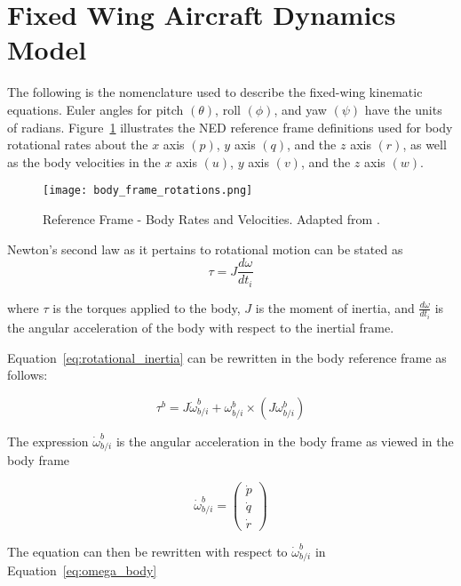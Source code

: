 \label{appendix:dynamics_model}
\section{Fixed Wing Aircraft Dynamics Model}

The following is the nomenclature used to describe the fixed-wing kinematic equations.  Euler angles for pitch $(\theta)$, roll $(\phi)$, and yaw $(\psi)$ have the units of radians.  Figure~\ref{fig:reference_frame} illustrates the \ac{NED} reference frame definitions used for body rotational rates about the $x$ axis $(p)$, $y$ axis $(q)$, and the $z$ axis $(r)$, as well as the body velocities in the $x$ axis $(u)$, $y$ axis $(v)$, and the $z$ axis $(w)$.

\begin{figure}[h!]
 \centering
  \texttt{[image: body\_frame\_rotations.png]}
  \caption{Reference Frame - Body Rates and Velocities.  Adapted from \cite{flitetest}.}
  \label{fig:reference_frame}
\end{figure} 

Newton's second law as it pertains to rotational motion can be stated as
\begin{equation}\label{eq:rotational_inertia}
\tau=J\frac{d\omega}{dt_i}
\end{equation}

where $\tau$ is the torques applied to the body, $J$ is the moment of inertia, and $ \frac{d\omega}{dt_i}$ is the angular acceleration of the body with respect to the inertial frame.

Equation~\ref{eq:rotational_inertia} can be rewritten in the body reference frame as follows:

\begin{equation}
\tau^b=J\dot{\omega}_{b/i}^b+\omega_{b/i}^b\times\left(J\omega_{b/i}^b\right)
\end{equation}

The expression $\dot{\omega}_{b/i}^b$ is the angular acceleration in the body frame as viewed in the body frame

\begin{equation}\label{eq:omega_body}
\dot{\omega}_{b/i}^b=
\begin{pmatrix}
\dot{p}\\
\dot{q}\\
\dot{r}
\end{pmatrix}
\end{equation}

The equation can then be rewritten with respect to $\dot{\omega}_{b/i}^b$ in Equation~\ref{eq:omega_body}

